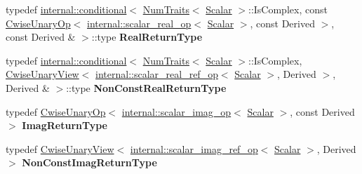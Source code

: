 \begin{DoxyCompactItemize}
typedef \mbox{\hyperlink{struct_eigen_1_1internal_1_1conditional}{internal\+::conditional}}$<$ \mbox{\hyperlink{struct_eigen_1_1_num_traits}{Num\+Traits}}$<$ \mbox{\hyperlink{class_eigen_1_1_dense_base_a5feed465b3a8e60c47e73ecce83e39a2}{Scalar}} $>$\+::Is\+Complex, const \mbox{\hyperlink{class_eigen_1_1_cwise_unary_op}{Cwise\+Unary\+Op}}$<$ \mbox{\hyperlink{struct_eigen_1_1internal_1_1scalar__real__op}{internal\+::scalar\+\_\+real\+\_\+op}}$<$ \mbox{\hyperlink{class_eigen_1_1_dense_base_a5feed465b3a8e60c47e73ecce83e39a2}{Scalar}} $>$, const Derived $>$, const Derived \& $>$\+::type {\bfseries Real\+Return\+Type}
\item 
\mbox{\label{class_eigen_1_1_matrix_base_a906067b7fa280f1483c8ec031026650a}} 
typedef \mbox{\hyperlink{struct_eigen_1_1internal_1_1conditional}{internal\+::conditional}}$<$ \mbox{\hyperlink{struct_eigen_1_1_num_traits}{Num\+Traits}}$<$ \mbox{\hyperlink{class_eigen_1_1_dense_base_a5feed465b3a8e60c47e73ecce83e39a2}{Scalar}} $>$\+::Is\+Complex, \mbox{\hyperlink{class_eigen_1_1_cwise_unary_view}{Cwise\+Unary\+View}}$<$ \mbox{\hyperlink{struct_eigen_1_1internal_1_1scalar__real__ref__op}{internal\+::scalar\+\_\+real\+\_\+ref\+\_\+op}}$<$ \mbox{\hyperlink{class_eigen_1_1_dense_base_a5feed465b3a8e60c47e73ecce83e39a2}{Scalar}} $>$, Derived $>$, Derived \& $>$\+::type {\bfseries Non\+Const\+Real\+Return\+Type}
\item 
\mbox{\label{class_eigen_1_1_matrix_base_ac82afc21635cb88c03de5f7621ae5342}} 
typedef \mbox{\hyperlink{class_eigen_1_1_cwise_unary_op}{Cwise\+Unary\+Op}}$<$ \mbox{\hyperlink{struct_eigen_1_1internal_1_1scalar__imag__op}{internal\+::scalar\+\_\+imag\+\_\+op}}$<$ \mbox{\hyperlink{class_eigen_1_1_dense_base_a5feed465b3a8e60c47e73ecce83e39a2}{Scalar}} $>$, const Derived $>$ {\bfseries Imag\+Return\+Type}
\item 
\mbox{\label{class_eigen_1_1_matrix_base_a868b29b14c6d76cd26f917e80c04b1b0}} 
typedef \mbox{\hyperlink{class_eigen_1_1_cwise_unary_view}{Cwise\+Unary\+View}}$<$ \mbox{\hyperlink{struct_eigen_1_1internal_1_1scalar__imag__ref__op}{internal\+::scalar\+\_\+imag\+\_\+ref\+\_\+op}}$<$ \mbox{\hyperlink{class_eigen_1_1_dense_base_a5feed465b3a8e60c47e73ecce83e39a2}{Scalar}} $>$, Derived $>$ {\bfseries Non\+Const\+Imag\+Return\+Type}
\item 
\mbox{\label{class_eigen_1_1_matrix_base_a89b87d933efd2413546b70b8c4fac81e}} 

\end{DoxyCompactItemize}
